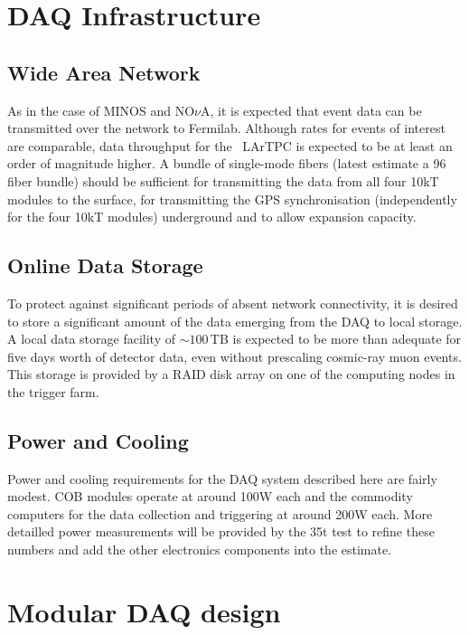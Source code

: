 \section{DAQ Infrastructure }
\label{sec:daq_infrastructure}

\subsection{Wide Area Network}

As in the case of MINOS and NO$\nu$A, it is expected that event data
can be transmitted over the network to Fermilab.  Although rates for
events of interest are comparable, data throughput for the \LBNE\
LArTPC is expected to be at least an order of magnitude higher.  A
bundle of single-mode fibers (latest estimate a 96 fiber bundle)
should be sufficient for transmitting the data from all four 10kT
modules to the surface, for transmitting the GPS synchronisation
(independently for the four 10kT modules) underground and to allow
expansion capacity.

\subsection{Online Data Storage}

To protect against significant periods of absent network connectivity,
it is desired to store a significant amount of the data emerging from
the DAQ to local storage.  A local data storage facility of $\sim
100\,$TB is expected to be more than adequate for five days worth of
detector data, even without prescaling cosmic-ray muon events.  This
storage is provided by a RAID disk array on one of the computing nodes
in the trigger farm.

\subsection{Power and Cooling}

Power and cooling requirements for the DAQ system described here are
fairly modest.  COB modules operate at around 100W each and the
commodity computers for the data collection and triggering at around
200W each.  More detailled power measurements will be provided by the
35t test to refine these numbers and add the other electronics
components into the estimate.

\section{Modular DAQ design}
\label{sec:daq_upper}

